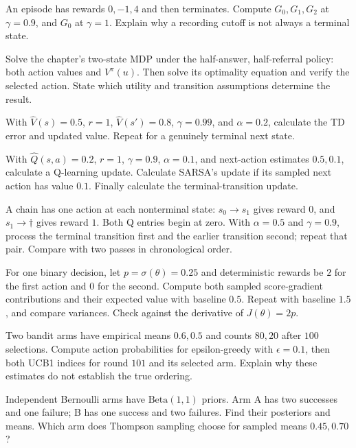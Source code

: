\begin{exercises}
\item {}An episode has rewards $0,-1,4$ and then terminates. Compute $G_0,G_1,G_2$ at $\gamma=0.9$, and $G_0$ at $\gamma=1$. Explain why a recording cutoff is not always a terminal state.
\item {}Solve the chapter's two-state MDP under the half-answer, half-referral policy: both action values and $V^\pi(u)$. Then solve its optimality equation and verify the selected action. State which utility and transition assumptions determine the result.
\item {}With $\hat V(s)=0.5$, $r=1$, $\hat V(s')=0.8$, $\gamma=0.99$, and $\alpha=0.2$, calculate the TD error and updated value. Repeat for a genuinely terminal next state.
\item {}With $\hat Q(s,a)=0.2$, $r=1$, $\gamma=0.9$, $\alpha=0.1$, and next-action estimates $0.5,0.1$, calculate a Q-learning update. Calculate SARSA's update if its sampled next action has value $0.1$. Finally calculate the terminal-transition update.
\item {}A chain has one action at each nonterminal state: $s_0\to s_1$ gives reward $0$, and $s_1\to\dagger$ gives reward $1$. Both Q entries begin at zero. With $\alpha=0.5$ and $\gamma=0.9$, process the terminal transition first and the earlier transition second; repeat that pair. Compare with two passes in chronological order.
\item {}For one binary decision, let $p=\sigma(\theta)=0.25$ and deterministic rewards be $2$ for the first action and $0$ for the second. Compute both sampled score-gradient contributions and their expected value with baseline $0.5$. Repeat with baseline $1.5$, and compare variances. Check against the derivative of $J(\theta)=2p$.
\item {}Two bandit arms have empirical means $0.6,0.5$ and counts $80,20$ after $100$ selections. Compute action probabilities for epsilon-greedy with $\epsilon=0.1$, then both UCB1 indices for round $101$ and its selected arm. Explain why these estimates do not establish the true ordering.
\item {}Independent Bernoulli arms have $\mathrm{Beta}(1,1)$ priors. Arm A has two successes and one failure; B has one success and two failures. Find their posteriors and means. Which arm does Thompson sampling choose for sampled means $0.45,0.70$?

\end{exercises}
